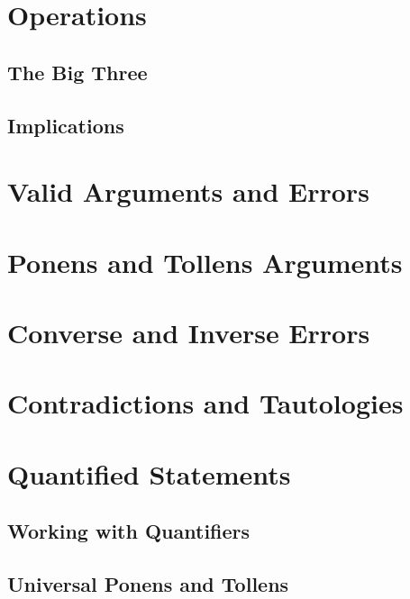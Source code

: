\section{Operations}
    \subsection{The Big Three}
    \subsection{Implications}
    
\section{Valid Arguments and Errors}
    \section{Ponens and Tollens Arguments}
    \section{Converse and Inverse Errors}
    \section{Contradictions and Tautologies}
    
\section{Quantified Statements}
    \subsection{Working with Quantifiers}
    \subsection{Universal Ponens and Tollens}
